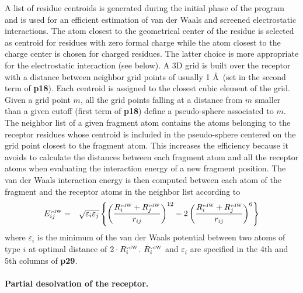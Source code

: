 \documentclass[a4paper,12pt,titlepage]{article}
\begin{document}
A list of residue centroids is generated during the initial phase of the 
program and is used for an efficient estimation of van der Waals and screened 
electrostatic interactions.
The atom closest to the geometrical center of the residue
is selected as centroid for residues with zero
formal charge while the atom closest to the charge center is chosen for 
charged residues. The latter choice is more appropriate for the electrostatic 
interaction (see below). A 3D grid is built over the receptor with a distance 
between neighbor grid points of usually 1 \AA \, (set in the second term of {\bf p18}). 
Each centroid is assigned to the closest cubic element of the grid. Given a 
grid point $m$, all the grid points falling at a distance from $m$ smaller than 
a given cutoff (first term of {\bf p18}) define a pseudo-sphere associated to $m$.
The neighbor list of a given fragment atom contains the atoms belonging to the 
receptor 
residues whose centroid is included in the pseudo-sphere centered on the grid 
point closest to the fragment atom. This increases the efficiency because it 
avoids to calculate the distances between each fragment atom and all the 
receptor atoms when evaluating the interaction energy of a new fragment 
position. The van der Waals interaction energy is then 
computed between each atom of the fragment and the receptor atoms in the 
neighbor list according to 
\begin{eqnarray}
E^{\mbox{\tiny vdW}}_{ij} & = & \sqrt{\varepsilon_i \varepsilon_j} \left\{
                          \left( \frac{R^{\mbox{\tiny vdW}}_i + 
                          R^{\mbox{\tiny vdW}}_j}
                          {r_{ij}} \right)^{12} - 2 \left( 
                          \frac{R^{\mbox{\tiny vdW}}_i + 
                          R^{\mbox{\tiny vdW}}_j}{r_{ij}}
                          \right)^{6} \right\}
\end{eqnarray}
where $\varepsilon_i$ is the minimum of the van der Waals potential between 
two atoms of type $i$ at optimal distance of $2 \cdot R^{\mbox{\tiny vdW}}_i$. 
$R^{\mbox{\tiny vdW}}_i$ and $\varepsilon_i$ are specified in the 4th and 5th 
columns of {\bf p29}.

\paragraph{Partial desolvation of the receptor.}
\end{document}
